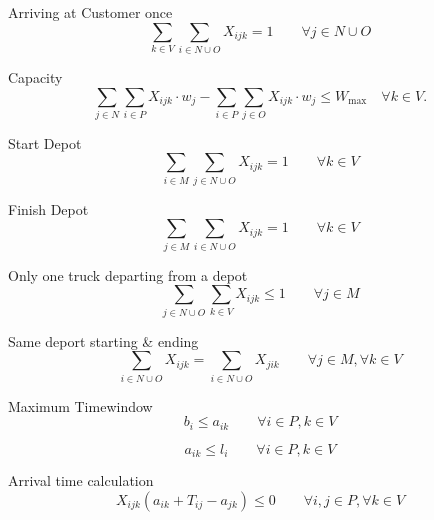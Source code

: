 Arriving at Customer once
\begin{equation} 
\sum_{k\in V}\sum_{i\in N \cup O} X_{ijk} = 1 \qquad   \forall j\in N \cup O
\label{F M1 Arriving at Customerrestriction}
\end{equation}

Capacity
\begin{equation} 
\sum_{j \in N} \sum_{i \in P} X_{ijk} \cdot w_j - \sum_{i \in P} \sum_{j \in O} X_{ijk} \cdot w_j \leq W_{\text{max}} \quad \forall k \in V.
\label{F M1 Capacity restriction}
\end{equation}

Start Depot
\begin{equation} 
\sum_{i \in M} \sum_{j\in N \cup O} X_{ijk} = 1    \qquad  \forall k \in V
\label{F M1 Start Depot restriction}
\end{equation}

Finish Depot
\begin{equation} 
\sum_{j \in M} \sum_{i\in N \cup O} X_{ijk} = 1    \qquad  \forall k \in V
\label{F M1 Finish Depot restriction}
\end{equation}

Only one truck departing from a depot
\begin{equation} 
\sum_{j \in N \cup O} \sum_{k\in V} X_{ijk} \leq 1    \qquad  \forall j \in M
\label{F M1 Only one truck departing from a depot}
\end{equation}

Same deport starting \& ending
\begin{equation} 
\sum_{i\in N \cup O} X_{ijk} = \sum_{i\in N \cup O} X_{jik}    \qquad  \forall j \in M, \forall k \in V
\label{F M1 Same deport starting & ending}
\end{equation}

Maximum Timewindow 
\begin{equation} 
b_i   \leq  a_{ik}   \qquad  \forall i \in P, k \in V 
\label{F M1 Maximum Timewindow1}
\end{equation}

\begin{equation} 
a_{ik} \leq   l_i             \qquad  \forall i \in P, k \in V
\label{F M1 Maximum Timewindow2}
\end{equation}

Arrival time calculation
\begin{equation} 
X_{ijk}(a_{ik} + T_{ij} - a_{jk})  \leq 0  \qquad  \forall i,j \in P, \forall k \in V
\label{F M1 Arrival time calculation}
\end{equation}

